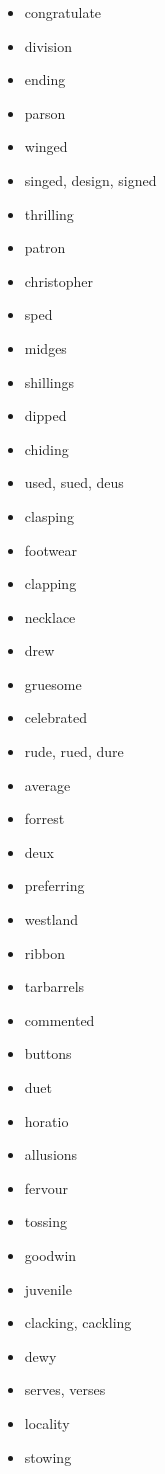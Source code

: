 \documentclass{article}
\begin{document}
\begin{itemize}
    \item congratulate
    \item division
    \item ending
    \item parson
    \item winged
    \item singed, design, signed
    \item thrilling
    \item patron
    \item christopher
    \item sped
    \item midges
    \item shillings
    \item dipped
    \item chiding
    \item used, sued, deus
    \item clasping
    \item footwear
    \item clapping
    \item necklace
    \item drew
    \item gruesome
    \item celebrated
    \item rude, rued, dure
    \item average
    \item forrest
    \item deux
    \item preferring
    \item westland
    \item ribbon
    \item tarbarrels
    \item commented
    \item buttons
    \item duet
    \item horatio
    \item allusions
    \item fervour
    \item tossing
    \item goodwin
    \item juvenile
    \item clacking, cackling
    \item dewy
    \item serves, verses
    \item locality
    \item stowing

\end{itemize}
\end{document}
